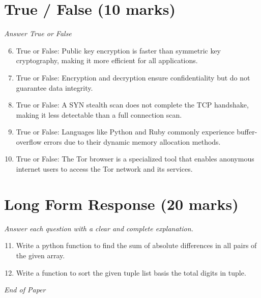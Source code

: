 \documentclass[12pt]{article}
\begin{document}
\section*{True / False (10 marks)}
\textit{Answer True or False}
\begin{enumerate}[label=\arabic*.]
\setcounter{enumi}{5}
\item True or False: Public key encryption is faster than symmetric key cryptography, making it more efficient for all applications.
\item True or False: Encryption and decryption ensure confidentiality but do not guarantee data integrity.
\item True or False: A SYN stealth scan does not complete the TCP handshake, making it less detectable than a full connection scan.
\item True or False: Languages like Python and Ruby commonly experience buffer-overflow errors due to their dynamic memory allocation methods.
\item True or False: The Tor browser is a specialized tool that enables anonymous internet users to access the Tor network and its services.
\end{enumerate}

\section*{Long Form Response (20 marks)}
\textit{Answer each question with a clear and complete explanation.}
\begin{enumerate}[label=\arabic*.]
\setcounter{enumi}{10}
\item Write a python function to find the sum of absolute differences in all pairs of the given array.
\item Write a function to sort the given tuple list basis the total digits in tuple.
\end{enumerate}

\vfill
\noindent\textit{End of Paper}
\end{document}
